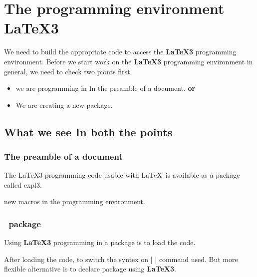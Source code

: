 \chapter{ The programming environment LaTeX3}

 We need to build the appropriate code to access the \textbf{LaTeX3} programming environment. Before we start work on the \textbf{LaTeX3} programming environment in general, we need to check two pionts first.

 \begin{itemize}
   \item we are programming in In the preamble of a document. \textbf{or}
   \item We are creating a new package.
 \end{itemize}

\section{What we see In both the points}

\subsection{The preamble of a document}
The LaTeX3 programming code usable with \LaTeX \ is available as a package called expl3.


new macros in the programming environment.

\begin{outputcfb}
\ExplSyntaxOn
\ExplSyntaxOff
\end{outputcfb}

\subsection{\LaTeXe \  package}

Using \textbf{LaTeX3} programming in a package is to load the code.

\begin{outputcfb}
\RequirePackage{expl3}
\end{outputcfb}

After loading the code, to switch the syntex on \cil| \ExplSyntaxOn| command used.
But more flexible alternative is to declare package using \textbf{LaTeX3}.

